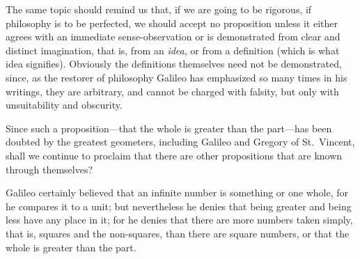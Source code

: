\documentclass[twoside,openright]{article}
\begin{document}
The same topic should remind us that, if we are going to be rigorous, if
philosophy is to be perfected, we should accept no proposition unless it
either agrees with an immediate sense-observation or is demonstrated from
clear and distinct imagination, that is, from an {\em idea}, or from a
definition (which is what idea signifies).  Obviously the definitions
themselves need not be demonstrated, since, as the restorer of philosophy
Galileo has emphasized so many times in his writings, they are arbitrary, and
cannot be charged with falsity, but only with unsuitability and obscurity.

Since such a proposition---that the whole is greater than the part---has
been doubted by the greatest geometers, including Galileo and Gregory of
St.\ Vincent, shall we continue to proclaim that there are other propositions
that are known through themselves?

Galileo certainly believed that an infinite number is something or one whole,
for he compares it to a unit; but nevertheless he denies that being greater
and being less have any place in it; for he denies that there are more numbers
taken simply, that is, squares and the non-squares, than there are square
numbers, or that the whole is greater than the part.
\end{document}
